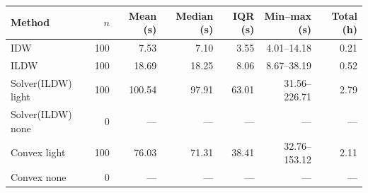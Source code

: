 \begin{tabular}{lrrrrrr}\toprule
Method & $n$ & Mean (s) & Median (s) & IQR (s) & Min--max (s) & Total (h) \\ \midrule
IDW & 100 & 7.53 & 7.10 & 3.55 & 4.01--14.18 & 0.21 \\
ILDW & 100 & 18.69 & 18.25 & 8.06 & 8.67--38.19 & 0.52 \\
Solver(ILDW) light & 100 & 100.54 & 97.91 & 63.01 & 31.56--226.71 & 2.79 \\
Solver(ILDW) none & 0 & --- & --- & --- & --- & --- \\
Convex light & 100 & 76.03 & 71.31 & 38.41 & 32.76--153.12 & 2.11 \\
Convex none & 0 & --- & --- & --- & --- & --- \\
\bottomrule\end{tabular}
